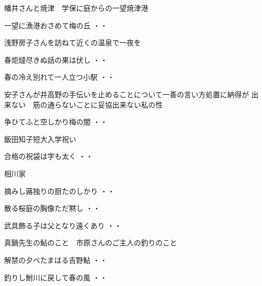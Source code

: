 \vspace{0.6cm}
幡井さんと焼津　学保に庭からの一望焼津港
\begin{shiika}一望に漁港おさめて梅の丘
\hfill{・・}\end{shiika}
\vspace{0.6cm}
浅野房子さんを訪ねて近くの温泉で一夜を
\begin{shiika}春炬燵尽きぬ話の果は伏し
\hfill{・・}\end{shiika}
\vspace{0.6cm}
\begin{shiika}春の冷え別れて一人立つ小駅
\hfill{・・}\end{shiika}
\vspace{0.6cm}
安子さんが井高野の手伝いを止めることについて一善の言い方処置に納得が
出来ない　筋の通らないことに妥協出来ない私の性
\begin{shiika}争ひてふと空しかり梅の闇
\hfill{・・}\end{shiika}
\vspace{0.6cm}
飯田知子短大入学祝い
\begin{shiika}合格の祝袋は字も太く
\hfill{・・}\end{shiika}
\vspace{0.6cm}
相川家
\begin{shiika}摘みし蕗独りの厨たのしかり
\hfill{・・}\end{shiika}
\vspace{0.6cm}
\begin{shiika}散る桜庭の胸像ただ黙し
\hfill{・・}\end{shiika}
\vspace{0.6cm}
\begin{shiika}武具飾る子は父となり遠くあり
\hfill{・・}\end{shiika}
\vspace{0.6cm}
真鍋先生の鮎のこと　市原さんのご主人の釣りのこと
\begin{shiika}解禁の夕べたまはる吉野鮎
\hfill{・・}\end{shiika}
\begin{shiika}釣りし鮒川に戻して春の風
\hfill{・・}\end{shiika}
\vspace{0.6cm}
